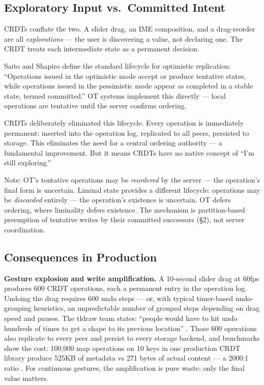 \subsection{Exploratory Input vs.\ Committed Intent}

CRDTs conflate the two. A slider drag, an IME composition, and a drag-reorder are all \emph{explorations} --- the user is discovering a value, not declaring one. The CRDT treats each intermediate state as a permanent decision.

Saito and Shapiro \cite{saito2005optimistic} define the standard lifecycle for optimistic replication: ``Operations issued in the optimistic mode accept or produce tentative states, while operations issued in the pessimistic mode appear as completed in a stable state, termed committed.'' OT systems implement this directly --- local operations are tentative until the server confirms ordering.

CRDTs deliberately eliminated this lifecycle. Every operation is immediately permanent: inserted into the operation log, replicated to all peers, persisted to storage. This eliminates the need for a central ordering authority --- a fundamental improvement. But it means CRDTs have no native concept of ``I'm still exploring.''

Note: OT's tentative operations may be \emph{reordered} by the server --- the operation's final form is uncertain. Liminal state provides a different lifecycle: operations may be \emph{discarded} entirely --- the operation's existence is uncertain. OT defers ordering, where liminality defers existence. The mechanism is partition-based preemption of tentative writes by their committed successors (\S2), not server coordination.

\subsection{Consequences in Production}

\textbf{Gesture explosion and write amplification.} A 10-second slider drag at 60fps produces 600 CRDT operations, each a permanent entry in the operation log. Undoing the drag requires 600 undo steps --- or, with typical timer-based undo-grouping heuristics, an unpredictable number of grouped steps depending on drag speed and pauses. The tldraw team states: ``people would have to hit undo hundreds of times to get a shape to its previous location'' \cite{tldraw:undo}. Those 600 operations also replicate to every peer and persist to every storage backend, and benchmarks show the cost: 100,000 map operations on 10 keys in one production CRDT library produce 525KB of metadata vs 271 bytes of actual content --- a 2000:1 ratio \cite{yjs:yutility}. For continuous gestures, the amplification is pure waste: only the final value matters.

